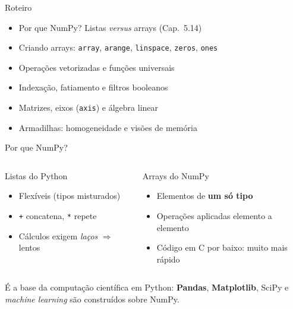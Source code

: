 \documentclass[aspectratio=169,10pt,t]{beamer}
\begin{document}
\capa

\begin{frame}{Roteiro}
  \begin{itemize}
    \item Por que NumPy? Listas \emph{versus} arrays (Cap.~5.14)
    \item Criando arrays: \texttt{array}, \texttt{arange}, \texttt{linspace}, \texttt{zeros}, \texttt{ones}
    \item Operações vetorizadas e funções universais
    \item Indexação, fatiamento e filtros booleanos
    \item Matrizes, eixos (\texttt{axis}) e álgebra linear
    \item Armadilhas: homogeneidade e visões de memória
  \end{itemize}
\end{frame}

\begin{frame}{Por que NumPy?}
  \begin{columns}[T]
    \begin{block}{Listas do Python}
      \begin{itemize}\small
        \item Flexíveis (tipos misturados)
        \item \texttt{+} concatena, \texttt{*} repete
        \item Cálculos exigem \emph{laços} \(\Rightarrow\) lentos
      \end{itemize}
    \end{block}
    \begin{exampleblock}{Arrays do NumPy}
      \begin{itemize}\small
        \item Elementos de \textbf{um só tipo}
        \item Operações aplicadas elemento a elemento
        \item Código em C por baixo: \alert{muito} mais rápido
      \end{itemize}
    \end{exampleblock}
  \end{columns}
  \vspace{1ex}
  É a base da computação científica em Python: \textbf{Pandas}, \textbf{Matplotlib}, SciPy e \emph{machine learning} são construídos sobre NumPy.
\end{frame}
\end{document}
